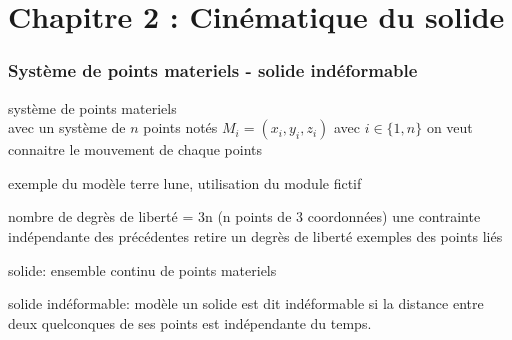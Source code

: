 \documentclass[../main.tex]{subfile}
\begin{document}
\part{Chapitre 2 : Cinématique du solide}

\section{Système de points materiels - solide indéformable}
\begin{defi}
	système de points materiels\\
	avec un système de $n$ points notés $M_i = (x_i, y_i, z_i)$ avec $i \in \{1, n\}$
	on veut connaitre le mouvement de chaque points
\end{defi}

\begin{ex}
	exemple du modèle terre lune, utilisation du module fictif
\end{ex}

	nombre de degrès de liberté = 3n (n points de 3 coordonnées)
	une contrainte indépendante des précédentes retire un degrès de liberté
	exemples des points liés

\begin{defi}
	solide:
	ensemble continu de points materiels
\end{defi}

\begin{defi}
	solide indéformable:
	modèle 
	un solide est dit indéformable si la distance entre deux quelconques de ses points est indépendante du temps.
\end{defi}
\end{document}
